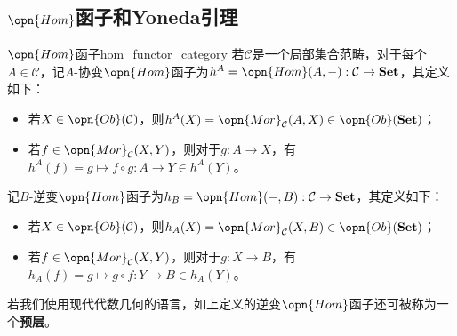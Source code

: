 \documentclass[../main.tex]{subfiles}
\begin{document}
\subsection{$\opn{Hom}$函子和Yoneda引理}
\begin{definition}{$\opn{Hom}$函子}{hom_functor_category}
若$\mathcal{C}$是一个局部集合范畴，对于每个$A\in\mathcal{C}$，记$A$-协变$\opn{Hom}$函子为$h^A=\opn{Hom}(A,-):\mathcal{C}\to\mathbf{Set}$，其定义如下：
\begin{itemize}
\item 若$X\in\opn{Ob}(\mathcal{C})$，则$h^A(X)=\opn{Mor}_\mathcal{C}(A,X)\in\opn{Ob}(\mathbf{Set})$；
\item 若$f\in\opn{Mor}_\mathcal{C}(X,Y)$，则对于$g:A\to X$，有$h^A(f)=g\mapsto f\circ g:A\to Y\in h^A(Y)$。
\end{itemize}

记$B$-逆变$\opn{Hom}$函子为$h_B=\opn{Hom}(-,B):\mathcal{C}\to\mathbf{Set}$，其定义如下：
\begin{itemize}
\item 若$X\in\opn{Ob}(\mathcal{C})$，则$h_A(X)=\opn{Mor}_\mathcal{C}(X,B)\in\opn{Ob}(\mathbf{Set})$；
\item 若$f\in\opn{Mor}_\mathcal{C}(X,Y)$，则对于$g:X\to B$，有$h_A(f)=g\mapsto g\circ f:Y\to B\in h_A(Y)$。
\end{itemize}
\end{definition}
若我们使用现代代数几何的语言，如上定义的逆变$\opn{Hom}$函子还可被称为一个\textbf{预层}。
\end{document}
